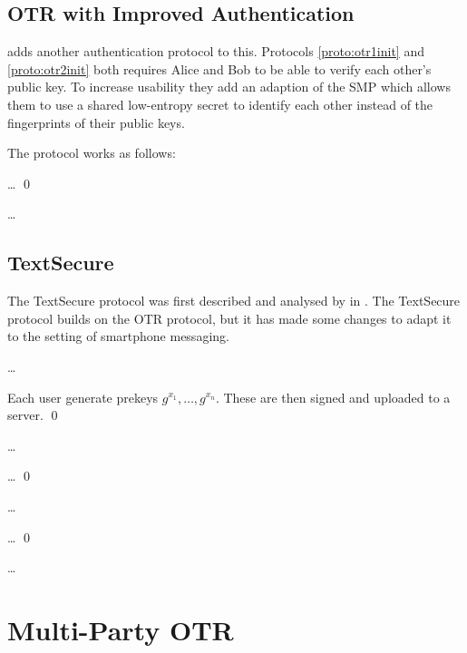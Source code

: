 \subsection{\acs{OTR} with Improved Authentication}

\citeauthor{otr2007} \cite{otr2007} adds another authentication protocol to 
this.
Protocols \ref{proto:otr1init} and \ref{proto:otr2init} both requires Alice and 
Bob to be able to verify each other's public key.
To increase usability they add an adaption of the \ac{SMP} \cite{smp} which 
allows them to use a shared low-entropy secret to identify each other instead 
of the fingerprints of their public keys.

The protocol works as follows:

\begin{protocol}
  \dots
  \qed
\end{protocol}

\dots

\subsection{TextSecure}

The TextSecure protocol was first described and analysed by 
\citeauthor{frosch2014secure} in \cite{frosch2014secure}.
The TextSecure protocol builds on the \ac{OTR} protocol, but it has made some 
changes to adapt it to the setting of smartphone messaging.

\dots

\begin{protocol}
  Each user generate prekeys \(g^{x_1}, \ldots, g^{x_n}\).
  These are then signed and uploaded to a server.
  \qed
\end{protocol}

\dots

\begin{protocol}
  \dots
  \qed
\end{protocol}

\dots

\begin{protocol}
  \dots
  \qed
\end{protocol}

\dots


\section{Multi-Party \acs{OTR}}


